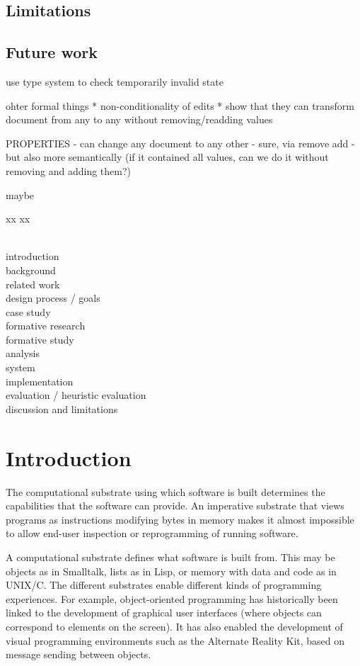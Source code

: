 \documentclass[sigconf]{acmart}
\begin{document}
\subsection{Limitations}
\subsection{Future work}
\label{sec:discuss-future}
use type system to check temporarily invalid state

ohter formal things
* non-conditionality of edits
* show that they can transform document from any to any without removing/readding values


PROPERTIES
- can change any document to any other - sure, via remove add - but also more semantically
(if it contained all values, can we do it without removing and adding them?)

maybe



xx
\newpage
xx

~\\
introduction \\
background \\
related work \\
design process / goals \\
case study \\
formative research \\
formative study \\
analysis \\
system \\
implementation \\
evaluation / heuristic evaluation \\
discussion and limitations \\

\newpage

\section{Introduction}

The computational substrate using which software is built determines the capabilities that the
software can provide. An imperative substrate that views programs as instructions modifying
bytes in memory makes it almost impossible to allow end-user inspection or reprogramming of
running software.

A computational substrate defines what software is built from. This may be objects as in
Smalltalk, lists as in Lisp, or memory with data and code as in UNIX/C.
The different substrates enable different kinds of programming experiences.
For example, object-oriented programming has historically been linked to the development
of graphical user interfaces (where objects can correspond to elements on the screen).
It has also enabled the development of visual programming environments such as the Alternate
Reality Kit, based on message sending between objects.
\end{document}
